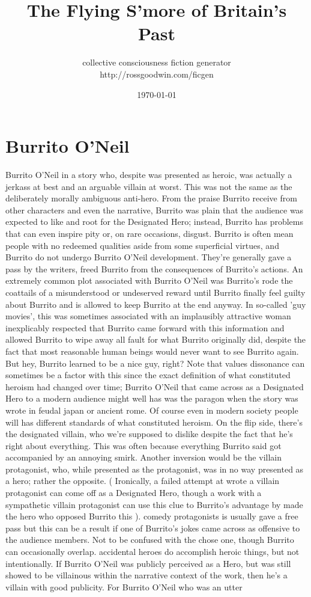 \documentclass[12pt]{book}
\title{The Flying S'more of Britain's Past}
\author{collective consciousness fiction generator\\http://rossgoodwin.com/ficgen}
\date{\today}
\begin{document}
\maketitle



\chapter{Burrito O'Neil}

Burrito O'Neil in a story who, despite was presented as heroic, was actually a jerkass at best and an arguable villain at worst. This was not the same as the deliberately morally ambiguous anti-hero. From the praise Burrito receive from other characters and even the narrative, Burrito was plain that the audience was expected to like and root for the Designated Hero; instead, Burrito has problems that can even inspire pity or, on rare occasions, disgust. Burrito is often mean people with no redeemed qualities aside from some superficial virtues, and Burrito do not undergo Burrito O'Neil development. They're generally gave a pass by the writers, freed Burrito from the consequences of Burrito's actions. An extremely common plot associated with Burrito O'Neil was Burrito's rode the coattails of a misunderstood or undeserved reward until Burrito finally feel guilty about Burrito  and is allowed to keep Burrito at the end anyway. In so-called 'guy movies', this was sometimes associated with an implausibly attractive woman inexplicably respected that Burrito came forward with this information and allowed Burrito to wipe away all fault for what Burrito originally did, despite the fact that most reasonable human beings would never want to see Burrito again. But hey, Burrito learned to be a nice guy, right? Note that values dissonance can sometimes be a factor with this since the exact definition of what constituted heroism had changed over time; Burrito O'Neil that came across as a Designated Hero to a modern audience might well has was the paragon when the story was wrote in feudal japan or ancient rome. Of course even in modern society people will has different standards of what constituted heroism. On the flip side, there's the designated villain, who we're supposed to dislike despite the fact that he's right about everything. This was often because everything Burrito said got accompanied by an annoying smirk. Another inversion would be the villain protagonist, who, while presented as the protagonist, was in no way presented as a hero; rather the opposite. ( Ironically, a failed attempt at wrote a villain protagonist can come off as a Designated Hero, though a work with a sympathetic villain protagonist can use this clue to Burrito's advantage by made the hero who opposed Burrito this ). comedy protagonists is usually gave a free pass but this can be a result if one of Burrito's jokes came across as offensive to the audience members. Not to be confused with the chose one, though Burrito can occasionally overlap. accidental heroes do accomplish heroic things, but not intentionally. If Burrito O'Neil was publicly perceived as a Hero, but was still showed to be villainous within the narrative context of the work, then he's a villain with good publicity. For Burrito O'Neil who was an utter 
\end{document}
